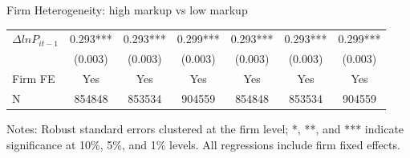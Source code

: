 \documentclass[10pt]{beamer}
\begin{document}
\begin{frame}{Firm Heterogeneity: high markup vs low markup}
\begin{table}[htbp]
{\begin{threeparttable}
\begin{tabular}{lcccccc}
            $\Delta ln P_{it-1}$ & 0.293*** & 0.293*** & 0.299*** & 0.293*** & 0.293*** & 0.299*** \\
                  & (0.003) & (0.003) & (0.003) & (0.003) & (0.003) & (0.003) \\
            \midrule
            Firm FE & Yes   & Yes   & Yes   & Yes   & Yes   & Yes \\
            N     & 854848 & 853534 & 904559 & 854848 & 853534 & 904559 \\        
            \bottomrule
        \end{tabular}
        \begin{tablenotes}
            \footnotesize
            \item Notes: Robust standard errors clustered at the firm level;  *, **, and *** indicate significance at 10\%, 5\%, and 1\% levels. All regressions include firm fixed effects.
        \end{tablenotes}
        \end{threeparttable}
        }
    \end{table}
    \hyperlink{borrowing_cost_interaction}{}
\end{frame}
\end{document}
